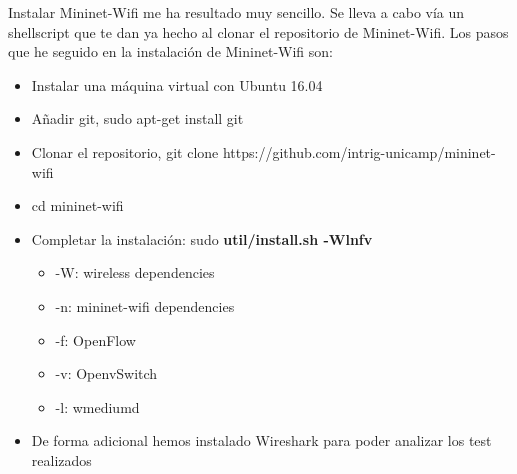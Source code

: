 Instalar Mininet-Wifi me ha resultado muy sencillo. Se lleva a cabo vía un shellscript que te dan ya hecho al clonar el repositorio de Mininet-Wifi. Los pasos que he seguido en la instalación de Mininet-Wifi son:
\begin{itemize}
    \item Instalar una máquina virtual con Ubuntu 16.04
    \item Añadir git, sudo apt-get install git 
    \item Clonar el repositorio, git clone https://github.com/intrig-unicamp/mininet-wifi
    \item cd mininet-wifi
    \item Completar la instalación: sudo \textbf{util/install.sh -Wlnfv}
    \begin{itemize}
        \item -W: wireless dependencies
        \item -n: mininet-wifi dependencies
        \item -f: OpenFlow
        \item -v: OpenvSwitch
        \item -l: wmediumd
    \end{itemize}
    \item De forma adicional hemos instalado Wireshark para poder analizar los test realizados
\end{itemize}



